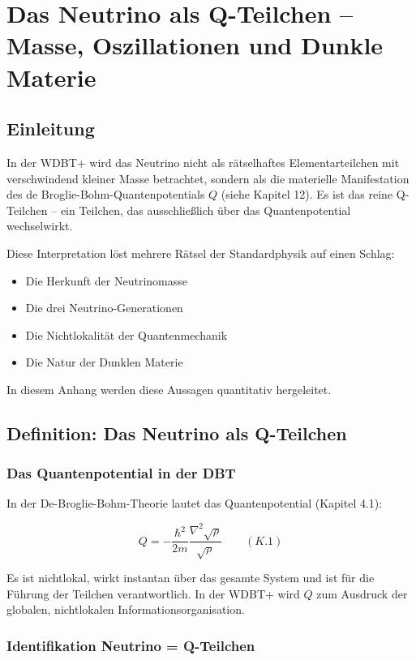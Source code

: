 \chapter{Das Neutrino als Q-Teilchen – Masse, Oszillationen und Dunkle Materie}

\section{Einleitung}

In der WDBT+ wird das Neutrino nicht als rätselhaftes Elementarteilchen mit 
verschwindend kleiner Masse betrachtet, sondern als die materielle Manifestation 
des de Broglie-Bohm-Quantenpotentials $Q$ (siehe Kapitel 12). Es ist das reine 
Q-Teilchen – ein Teilchen, das ausschließlich über das Quantenpotential wechselwirkt.

Diese Interpretation löst mehrere Rätsel der Standardphysik auf einen Schlag:
\begin{itemize}
    \item Die Herkunft der Neutrinomasse
    \item Die drei Neutrino-Generationen
    \item Die Nichtlokalität der Quantenmechanik
    \item Die Natur der Dunklen Materie
\end{itemize}

In diesem Anhang werden diese Aussagen quantitativ hergeleitet.

\section{Definition: Das Neutrino als Q-Teilchen}

\subsection{Das Quantenpotential in der DBT}

In der De-Broglie-Bohm-Theorie lautet das Quantenpotential (Kapitel 4.1):

\[
Q = -\frac{\hbar^2}{2m} \frac{\nabla^2 \sqrt{\rho}}{\sqrt{\rho}} \qquad (K.1)
\]

Es ist nichtlokal, wirkt instantan über das gesamte System und ist für die Führung 
der Teilchen verantwortlich. In der WDBT+ wird $Q$ zum Ausdruck der globalen, 
nichtlokalen Informationsorganisation.

\subsection{Identifikation Neutrino = Q-Teilchen}

